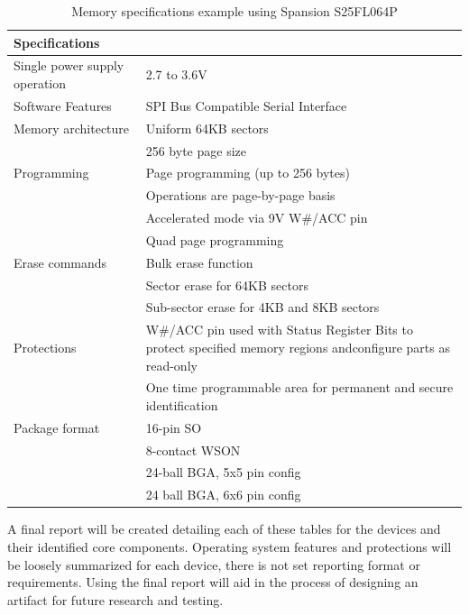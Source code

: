 \begin{table}[H]
  \centering
  \begin{tabular}{|p{6cm}|p{9cm}|}
    \hline\rowcolor{gray!30}

    \textbf{Specifications} &  \\
    \hline

    Single power supply operation & 2.7 to 3.6V \\
    \hline

    Software Features & SPI Bus Compatible Serial Interface \\
    \hline

    Memory architecture & Uniform 64KB sectors \\
    & 256 byte page size \\
    \hline

    Programming & Page programming (up to 256 bytes) \\
    & Operations are page-by-page basis \\
    & Accelerated mode via 9V W\#/ACC pin \\
    & Quad page programming \\
    \hline

    Erase commands & Bulk erase function \\
     & Sector erase for 64KB sectors \\
     & Sub-sector erase for 4KB and 8KB sectors \\
    \hline

    Protections & W\#/ACC pin used with Status Register Bits to protect specified memory regions andconfigure parts as read-only \\
    & One time programmable area for permanent and secure identification \\
    \hline

    Package format & 16-pin SO \\
    & 8-contact WSON \\
    & 24-ball BGA, 5x5 pin config \\
    & 24 ball BGA, 6x6 pin config \\
    \hline

  \end{tabular}
  \caption{Memory specifications example using Spansion S25FL064P}
  \label{fig:memory_specs}%
\end{table}

A final report will be created detailing each of these tables for the devices and their identified core components. Operating system features and protections will be loosely summarized for each device, there is not set reporting format or requirements. Using the final report will aid in the process of designing an artifact for future research and testing.

